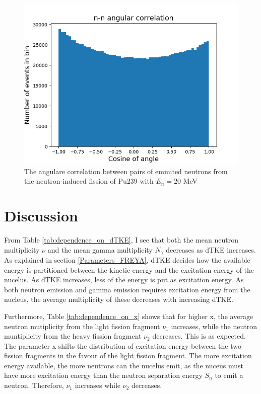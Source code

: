 \documentclass[]{article}
\begin{document}
\begin{figure} [H]
	\centering
	\includegraphics[scale=0.65]{Pu239_20_n_n_ang_corr.png}
	\caption{The angulare correlation between pairs of emmited neutrons from the neutron-induced fission of Pu239 with $E_n= 20$ MeV}
	\label{fig:Pu239_20_n_n_ang_corr}
\end{figure}

\section{Discussion}
\label{Discussion}

From Table \ref{tab:dependence_on_dTKE}, I see that both the mean neutron multiplicity $\nu$ and the mean gamma multiplicity $N_{\gamma}$ decreases as dTKE increases. As explained in section \ref{Parameters_FREYA}, dTKE decides how the available energy is partitioned between the kinetic energy and the excitation energy of the nucelus. As dTKE increases, less of the energy is put as excitation energy. As both neutron emission and gamma emission requires excitation energy from the nucleus, the average multiplicity of these decreases with increasing dTKE.\par 
\vspace{3mm}

Furthermore, Table \ref{tab:dependence_on_x} shows that for higher x, the average neutron mutiplicity from the light fission fragment $\nu_1$ increases, while the neutron muntiplicity from the heavy fission fragment $\nu_2$ decreases. This is as expected. The parameter x shifts the distribution of excitation energy between the two fission fragments in the favour of the light fission fragment. The more excitation energy available, the more neutrons can the nucelus emit, as the nuceus must have more excitation energy than the neutron separation energy $S_n$ to emit a neutron. Therefore, $\nu_1$ increases while $\nu_2$ decreases. \par 
\vspace{3mm}
\end{document}
